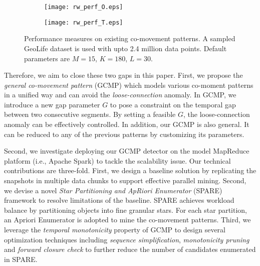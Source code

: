 \begin{figure}[h]
	\vspace{-3mm}
    \centering
    \begin{subfigure}[b]{0.23\textwidth}
            \centering
            \texttt{[image: rw\_perf\_O.eps]}
    \label{fig:fig1}
    \end{subfigure}
    \begin{subfigure}[b]{0.23\textwidth}
            \centering
            \texttt{[image: rw\_perf\_T.eps]}
    \label{fig:fig2}
    \end{subfigure}
    \vspace{-2mm}
    \caption{Performance measures on existing co-movement patterns. A sampled GeoLife dataset
    is used with upto 2.4 million data points. Default parameters are $M=15$, $K=180$, $L=30$.}
    \label{fig:related_work_scalability}
\end{figure}

Therefore, we aim to close these two gaps in this paper. 
First, we propose the \emph{general co-movement pattern} (GCMP) which models
various co-moment patterns in a unified way and can avoid 
the \emph{loose-connection} anomaly. In GCMP, we introduce a new gap parameter $G$ to pose a constraint on the temporal gap between two consecutive segments. 
By setting a feasible $G$, the loose-connection anomaly can be effectively controlled. In addition, our GCMP is also general. %
It can be reduced to any of the previous patterns by customizing its parameters.

Second, we investigate deploying our GCMP detector on the model MapReduce platform (i.e., Apache Spark) to tackle the scalability issue. Our technical contributions are three-fold. First, we design a baseline solution by replicating the snapshots in multiple data chunks to support effective parallel mining. Second, we devise a novel \emph{Star Partitioning and ApRiori Enumerator} (SPARE) framework to resolve limitations of the baseline. SPARE achieves workload balance by partitioning objects into fine granular stars.  For each star partition, an Apriori Enumerator is adopted to mine the co-movement patterns. Third, we leverage the \emph{temporal monotonicity} property of GCMP 
to design several optimization techniques including \emph{sequence simplification}, \emph{monotonicity pruning} and \emph{forward closure check} to further reduce the number of candidates enumerated in SPARE.

